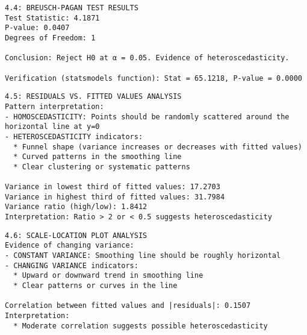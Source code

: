 \documentclass[8pt, twocolumn]{extarticle}
\begin{document}
    \begin{Verbatim}[commandchars=\\\{\}]
4.4: BREUSCH-PAGAN TEST RESULTS
Test Statistic: 4.1871
P-value: 0.0407
Degrees of Freedom: 1

Conclusion: Reject H0 at α = 0.05. Evidence of heteroscedasticity.

Verification (statsmodels function): Stat = 65.1218, P-value = 0.0000
    \end{Verbatim}

    \begin{Verbatim}[commandchars=\\\{\}]
4.5: RESIDUALS VS. FITTED VALUES ANALYSIS
Pattern interpretation:
- HOMOSCEDASTICITY: Points should be randomly scattered around the horizontal line at y=0
- HETEROSCEDASTICITY indicators:
  * Funnel shape (variance increases or decreases with fitted values)
  * Curved patterns in the smoothing line
  * Clear clustering or systematic patterns

Variance in lowest third of fitted values: 17.2703
Variance in highest third of fitted values: 31.7984
Variance ratio (high/low): 1.8412
Interpretation: Ratio > 2 or < 0.5 suggests heteroscedasticity
    \end{Verbatim}
    \centering
    \begin{Verbatim}[commandchars=\\\{\}]
4.6: SCALE-LOCATION PLOT ANALYSIS
Evidence of changing variance:
- CONSTANT VARIANCE: Smoothing line should be roughly horizontal
- CHANGING VARIANCE indicators:
  * Upward or downward trend in smoothing line
  * Clear patterns or curves in the line

Correlation between fitted values and |residuals|: 0.1507
Interpretation:
  * Moderate correlation suggests possible heteroscedasticity
    \end{Verbatim}

    \centering
\end{document}
